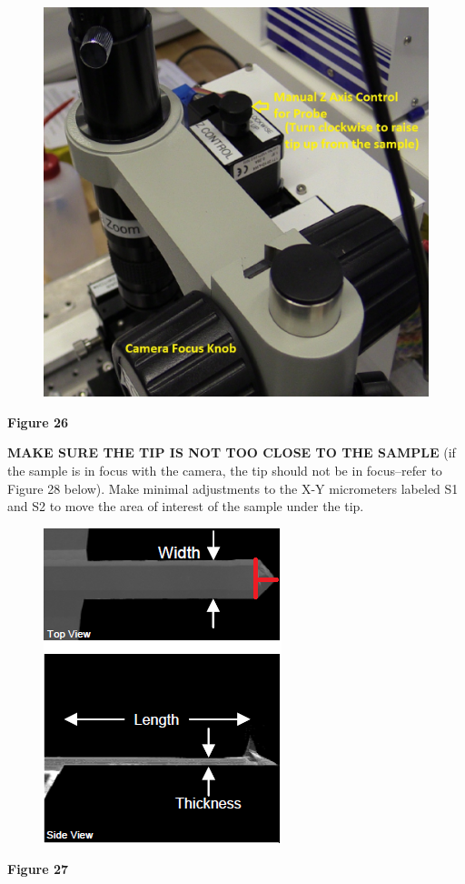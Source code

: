 \documentclass{../lab}
\begin{document}
\begin{figure}[h]
    \centering
    \href{http://dev-physicsadv.pantheon.berkeley.edu/sites/default/files/AFMImages/ZControl.jpg}{\includegraphics[width=0.5\linewidth]{images/ZControl.jpg}}
    \caption{}
    \label{fig:ZControl}
\end{figure}


\textbf{Figure 26}

\textbf{MAKE SURE THE TIP IS NOT TOO CLOSE TO THE SAMPLE} (if the sample is in focus with the camera, the tip should not be in focus--refer to Figure 28 below).  Make minimal adjustments to the X-Y micrometers labeled S1 and S2 to move the area of interest of the sample under the tip.


\begin{figure}[h]
    \centering
    \href{http://dev-physicsadv.pantheon.berkeley.edu/sites/default/files/AFMImages/26.png}{\includegraphics[width=0.5\linewidth]{images/26.png}}
    \caption{}
    \label{fig:26}
\end{figure}


\textbf{Figure 27}
\end{document}
